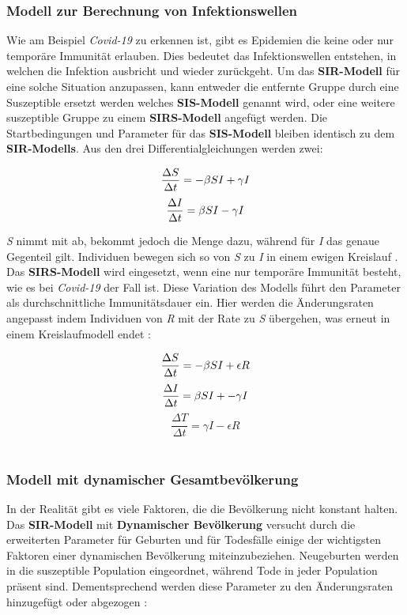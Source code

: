 \documentclass[12pt]{scrartcl} %
\begin{document}
\subsubsection{Modell zur Berechnung von Infektionswellen}

Wie am Beispiel \textsl{Covid-19} zu erkennen ist, gibt es Epidemien die keine oder nur temporäre Immunität erlauben. Dies bedeutet das Infektionswellen entstehen, in welchen die Infektion ausbricht und wieder zurückgeht. Um das \textbf{SIR-Modell} für eine solche Situation anzupassen, kann entweder die entfernte Gruppe durch eine Suszeptible ersetzt werden welches \textbf{SIS-Modell} genannt wird, oder eine weitere suszeptible Gruppe zu einem \textbf{SIRS-Modell} angefügt werden. Die Startbedingungen und Parameter für das \textbf{SIS-Modell} bleiben identisch zu dem \textbf{SIR-Modells}. Aus den drei Differentialgleichungen werden zwei:

$$ \frac{\Delta S}{\Delta t} = -\beta\space S I + \gamma I $$
$$ \frac{\Delta I}{\Delta t} = \beta\space S I - \gamma I$$

\textit{S} nimmt mit \textbeta\space ab, bekommt jedoch die Menge \textgamma\space dazu, während für \textit{I} das genaue Gegenteil gilt. Individuen bewegen sich so von \textit{S} zu \textit{I} in einem ewigen Kreislauf \cite{5}.\\
Das \textbf{SIRS-Modell} wird eingesetzt, wenn eine nur temporäre Immunität besteht, wie es bei \textsl{Covid-19} der Fall ist. Diese Variation des Modells führt den Parameter \textepsilon\space als durchschnittliche Immunitätsdauer ein. Hier werden die Änderungsraten angepasst indem Individuen von \textit{R} mit der Rate \textepsilon\space zu \textit{S} übergehen, was erneut in einem Kreislaufmodell endet \cite{8}:

$$ \frac{\Delta S}{\Delta t} = -\beta\space S I + \epsilon R $$
$$ \frac{\Delta I}{\Delta t} = \beta\space S I + -\gamma I $$
$$ \frac{\Delta T}{\Delta t} = \gamma I - \epsilon R $$\\

\subsubsection{Modell mit dynamischer Gesamtbevölkerung}

In der Realität gibt es viele Faktoren, die die Bevölkerung nicht konstant halten. Das \textbf{SIR-Modell} mit \textbf{Dynamischer Bevölkerung} versucht durch die erweiterten Parameter \textnu\space für Geburten und \textmu\space für Todesfälle einige der wichtigsten Faktoren einer dynamischen Bevölkerung miteinzubeziehen. Neugeburten werden in die suszeptible Population eingeordnet, während Tode in jeder Population präsent sind. Dementsprechend werden diese Parameter zu den Änderungsraten hinzugefügt oder abgezogen \cite{8}:
\end{document}
